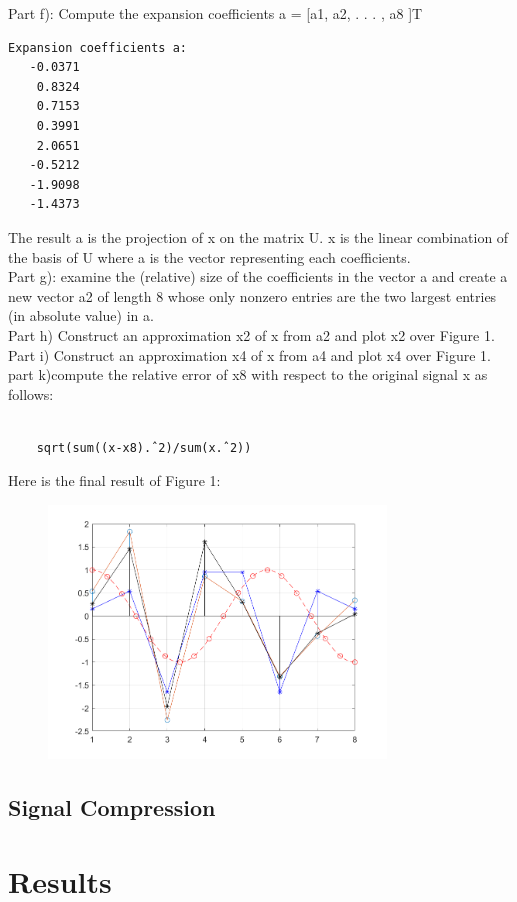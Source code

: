 \documentclass{article}
\begin{document}
Part f): Compute the expansion coefficients a = [a1, a2, . . . , a8 ]T\\
\begin{verbatim}
Expansion coefficients a:
   -0.0371
    0.8324
    0.7153
    0.3991
    2.0651
   -0.5212
   -1.9098
   -1.4373
\end{verbatim}
The result a is the projection of x on the matrix U. x is the linear combination of the basis of U where a is the vector representing each coefficients. \\
Part g): examine the (relative) size of the coefficients in the vector a and create a new vector a2 of
length 8 whose only nonzero entries are the two largest entries (in absolute value) in a.\\
Part h) Construct an approximation x2 of x from a2 and plot x2 over Figure 1.\\
Part i) Construct an approximation x4 of x from a4 and plot x4 over Figure 1.\\
part k)compute the relative error of x8 with respect to the original signal x as follows:
\begin{verbatim}
    
    sqrt(sum((x-x8).ˆ2)/sum(x.ˆ2))
\end{verbatim}
Here is the final result of Figure 1:\\
\begin{figure}[H]
  \centering
  \includegraphics[width=0.8\textwidth]{Figure_1.png}
  \label{fig:music}
\end{figure}
\subsection{Signal Compression}

\section{Results}
\end{document}
